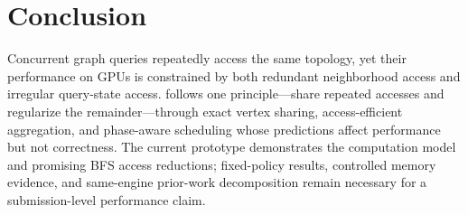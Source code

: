 \section{Conclusion}

Concurrent graph queries repeatedly access the same topology, yet their performance on GPUs is constrained by both redundant neighborhood access and irregular query-state access.
\system follows one principle---share repeated accesses and regularize the remainder---through exact vertex sharing, access-efficient aggregation, and phase-aware scheduling whose predictions affect performance but not correctness.
The current prototype demonstrates the computation model and promising BFS access reductions; fixed-policy results, controlled memory evidence, and same-engine prior-work decomposition remain necessary for a submission-level performance claim.
